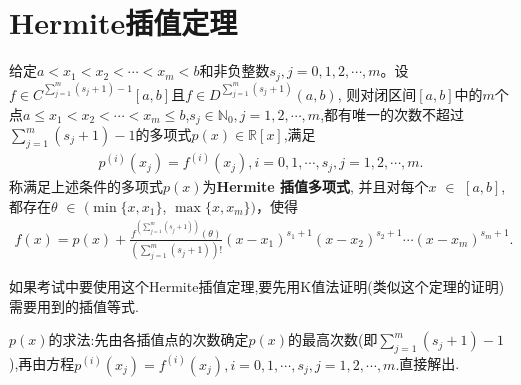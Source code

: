 \documentclass[../../main.tex]{subfiles}%
\begin{document}
\section{Hermite插值定理}

\begin{theorem}[Hermite插值定理]\label{theorem:Hermite插值定理}
给定\(a < x_1 < x_2 < \cdots < x_m < b\)和非负整数\(s_j,j = 0,1,2,\cdots,m\)。设\(f \in C^{\sum\limits_{j = 1}^{m}(s_j + 1)-1}[a,b]\)且\(f \in D^{\sum\limits_{j = 1}^{m}(s_j + 1)}(a,b)\),
则对闭区间\([a,b]\)中的\(m\)个点\(a \leqslant  x_1 < x_2 < \cdots < x_m \leqslant  b\),\(s_j \in \mathbb{N}_0,j = 1,2,\cdots,m\),都有唯一的次数不超过$\sum_{j = 1}^{m}(s_j + 1)-1$的多项式$p(x)\in \mathbb{R}[x]$,满足
\begin{align*}
p^{(i)}(x_j)=f^{(i)}(x_j),i = 0,1,\cdots,s_j,j = 1,2,\cdots,m.
\end{align*}
称满足上述条件的多项式$p(x)$为\textbf{Hermite 插值多项式},
并且对每个$x$ $\in$ $[a,b]$,都存在$\theta$ $\in$ $(\min\{x,x_1\}$, $\max\{x,x_m\})$，使得
\begin{align*}
f(x)=p(x)+\frac{f^{(\sum\limits_{j = 1}^{m}(s_j + 1))}(\theta)}{\left(\sum\limits_{j = 1}^{m}(s_j + 1)\right)!}(x - x_1)^{s_1 + 1}(x - x_2)^{s_2 + 1}\cdots(x - x_m)^{s_m + 1}.
\end{align*}
\end{theorem}
\begin{remark}
如果考试中要使用这个Hermite插值定理,要先用K值法证明(类似这个定理的证明)需要用到的插值等式.
\end{remark}
\begin{remark}
$p(x)$的求法:先由各插值点的次数确定$p(x)$的最高次数(即$\sum_{j = 1}^{m}(s_j + 1)-1$),再由方程$p^{(i)}(x_j)=f^{(i)}(x_j),i = 0,1,\cdots,s_j,j = 1,2,\cdots,m.$直接解出.
\end{remark}
\end{document}
